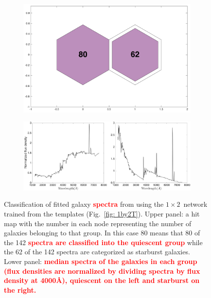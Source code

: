             \begin{figure}
                \begin{subfigure}[b]{0.45\textwidth}
                    \centering
                    \includegraphics[width=\textwidth]{images0.01/1d/hit_v_1_by_2.png}
                \end{subfigure}
                \hfill
                \begin{subfigure}[b]{0.45\textwidth}
                     \includegraphics[width=\textwidth]{images0.01/1d/SED_total1by2_fluxdensity.png}
                \end{subfigure}
                \caption{Classification of fitted galaxy \textbf{\textcolor{red}{spectra}} from \citet{Hossein12} using the $1\times2$~network trained from the \citet{Kinney96} templates (Fig.~\ref{fig: 1by2T}). Upper panel: a hit map with the number in each node representing the number of galaxies belonging to that group. In this case 80 means that 80 of the 142 \textbf{\textcolor{red}{spectra are classified into the quiescent group}} while the 62 of the 142 spectra are categorized as starburst galaxies. Lower panel: \textbf{\textcolor{red}{median spectra of the galaxies in each group (flux densities are normalized by dividing spectra by flux density at 4000\AA), quiescent on the left and starburst on the right.}}}
                \label{fig: 1by2V}
            \end{figure}          
            
